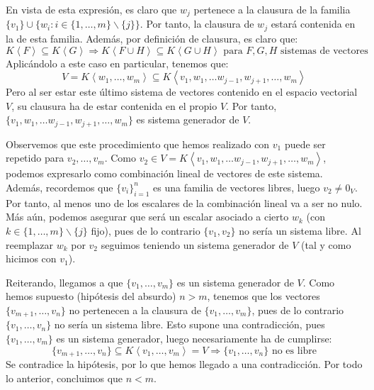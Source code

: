 \documentclass[12pt]{article}
\begin{document}
En vista de esta expresión, es claro que $w_j$ pertenece a la clausura de la familia
$\{v_1\}\cup\big\{w_i : i \in \{1, \ldots, m\}\backslash\{j\} \big\}$. Por tanto, la clausura de
$w_j$ estará contenida en la de esta familia. Además, por definición de clausura, es claro que: 
$$K\left<F\right> \subseteq K\left<G\right> \Rightarrow
    K\left<F \cup H\right> \subseteq K\left<G \cup H\right>
\text{ para }F,G,H \text{ sistemas de vectores}$$
\newpage
Aplicándolo a este caso en particular, tenemos que: \vspace{-3mm}
$$V = K\left<w_1, \ldots, w_m\right> \subseteq
K\left<v_1, w_1, \ldots w_{j-1}, w_{j+1}, \ldots, w_m\right>$$
Pero al ser estar este último sistema de vectores contenido en el espacio vectorial $V$, su clausura
ha de estar contenida en el propio $V$. Por tanto, $\{v_1, w_1, \ldots w_{j-1}, w_{j+1}, \ldots, w_m\} $ es sistema generador de $V$.

\vspace{2mm}
Observemos que este procedimiento que hemos realizado con $v_1$ puede ser repetido para
$v_2, \ldots, v_m$. Como $v_2 \in V = K\left<v_1, w_1, \ldots w_{j-1}, w_{j+1}, \ldots, w_m\right>$,
podemos expresarlo como combinación lineal de vectores de este sistema. Además, recordemos que $\{v_i\}_{i=1}^n$
es una familia de vectores libres, luego $v_2 \neq 0_V$. Por tanto, al menos uno de los escalares de la combinación
lineal va a ser no nulo. Más aún, podemos asegurar que será un escalar asociado a cierto $w_k$
(con $k \in \{1, \ldots, m\}\backslash\{j\}  $ fijo), pues
de lo contrario $\{v_1, v_2\}$ no sería un sistema libre.
Al reemplazar $w_k$ por $v_2$ seguimos teniendo un sistema generador de $V$ (tal y como hicimos con $v_1$).

\vspace{2mm}
Reiterando, llegamos a que $\{v_1, \ldots, v_m\}$ es un sistema generador de $V$. Como hemos supuesto (hipótesis
del absurdo) $n > m$, tenemos que los vectores $\{v_{m+1}, \ldots, v_n\}$ no pertenecen a la clausura de $\{v_1, \ldots, v_m\}$,
pues de lo contrario $\{v_1, \ldots, v_n\}$ no sería un sistema libre. Esto supone una contradicción, pues $\{v_1, \ldots, v_m\}$
es un sistema generador, luego necesariamente ha de cumplirse: \vspace{-3mm}
$$\{v_{m+1}, \ldots, v_n\} \subseteq K\left<v_1, \ldots, v_m\right> = V \Rightarrow \{v_1, \ldots, v_n\} \text{ no es libre}$$
Se contradice la hipótesis, por lo que hemos llegado a una contradicción. Por todo lo anterior, concluimos que $n < m$.
\end{document}
